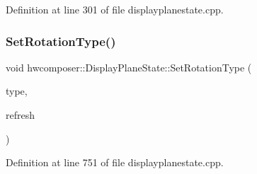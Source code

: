 Definition at line 301 of file displayplanestate.\+cpp.


\begin{DoxyCode}{0}
\end{DoxyCode}
\mbox{\label{classhwcomposer_1_1DisplayPlaneState_a47bb9fccfaf18b5eeacd2a5142cb3910}} 
\subsubsection{\texorpdfstring{Set\+Rotation\+Type()}{SetRotationType()}}
{\footnotesize\ttfamily void hwcomposer\+::\+Display\+Plane\+State\+::\+Set\+Rotation\+Type (\begin{DoxyParamCaption}\item[{\mbox{\hyperlink{classhwcomposer_1_1DisplayPlaneState_a907c53d6739ccbfb5058a0f34f3de657}{Rotation\+Type}}}]{type,  }\item[{bool}]{refresh }\end{DoxyParamCaption})}



Definition at line 751 of file displayplanestate.\+cpp.


